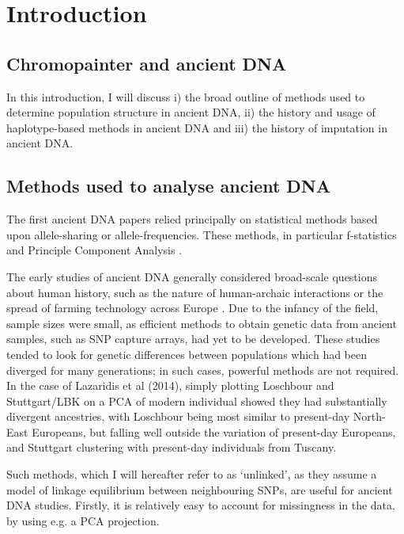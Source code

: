 \chapter{Introduction}

\section{Chromopainter and ancient DNA}

In this introduction, I will discuss i) the broad outline of methods used to determine population structure in ancient DNA, ii) the history and usage of haplotype-based methods in ancient DNA and iii) the history of imputation in ancient DNA.

\section{Methods used to analyse ancient DNA}

The first ancient DNA papers relied principally on statistical methods based upon allele-sharing or allele-frequencies. These methods, in particular f-statistics \cite{Green2010, Patterson2012, peter2016admixture} and Principle Component Analysis \cite{price2006principal}. 

The early studies of ancient DNA generally considered broad-scale questions about human history, such as the nature of human-archaic interactions or the spread of farming technology across Europe \cite{Lazaridis2014}. Due to the infancy of the field, sample sizes were small, as efficient methods to obtain genetic data from ancient samples, such as SNP capture arrays, had yet to be developed. These studies tended to look for genetic differences between populations which had been diverged for many generations; in such cases, powerful methods are not required. In the case of Lazaridis et al (2014), simply plotting Loschbour and Stuttgart/LBK on a PCA of modern individual showed they had substantially divergent ancestries, with Loschbour being most similar to present-day North-East Europeans, but falling well outside the variation of present-day Europeans, and Stuttgart clustering with present-day individuals from Tuscany. 

Such methods, which I will hereafter refer to as `unlinked', as they assume a model of linkage equilibrium between neighbouring SNPs, are useful for ancient DNA studies. Firstly, it is relatively easy to account for missingness in the data, by using e.g. a PCA projection. 

